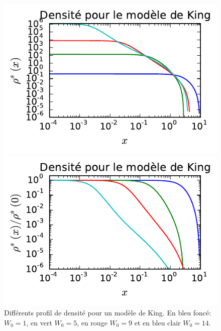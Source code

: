	\begin{figure}[ht!]
			\begin{minipage}[b]{0.40\linewidth}
				\centering \includegraphics{graphe/king.pdf}
			\end{minipage}\hfill
			\begin{minipage}[b]{0.48\linewidth}
				\centering \includegraphics{graphe/king_n.pdf}
			\end{minipage}
			\caption{Différents profil de densité pour un modèle de King. En bleu foncé: $W_0=1$, en vert
			$W_0=5$, en rouge $W_0=9$ et en bleu clair $W_0=14$.\label{King_Modele-test}}
	\end{figure}

	
